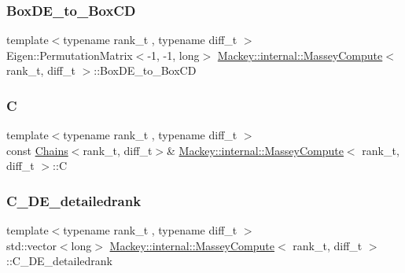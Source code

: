 \subsubsection{\texorpdfstring{Box\+D\+E\+\_\+to\+\_\+\+Box\+CD}{BoxDE\_to\_BoxCD}}
{\footnotesize\ttfamily template$<$typename rank\+\_\+t , typename diff\+\_\+t $>$ \\
Eigen\+::\+Permutation\+Matrix$<$-\/1, -\/1, long$>$ \hyperlink{structMackey_1_1internal_1_1MasseyCompute}{Mackey\+::internal\+::\+Massey\+Compute}$<$ rank\+\_\+t, diff\+\_\+t $>$\+::Box\+D\+E\+\_\+to\+\_\+\+Box\+CD}

\mbox{\label{structMackey_1_1internal_1_1MasseyCompute_abf562dca46d53425d1460f1098d8997d}} 
\subsubsection{\texorpdfstring{C}{C}}
{\footnotesize\ttfamily template$<$typename rank\+\_\+t , typename diff\+\_\+t $>$ \\
const \hyperlink{classMackey_1_1Chains}{Chains}$<$rank\+\_\+t, diff\+\_\+t$>$\& \hyperlink{structMackey_1_1internal_1_1MasseyCompute}{Mackey\+::internal\+::\+Massey\+Compute}$<$ rank\+\_\+t, diff\+\_\+t $>$\+::C}

\mbox{\label{structMackey_1_1internal_1_1MasseyCompute_a2b68ea91e153d3c1672487327da69434}} 
\subsubsection{\texorpdfstring{C\+\_\+\+D\+E\+\_\+detailedrank}{C\_DE\_detailedrank}}
{\footnotesize\ttfamily template$<$typename rank\+\_\+t , typename diff\+\_\+t $>$ \\
std\+::vector$<$long$>$ \hyperlink{structMackey_1_1internal_1_1MasseyCompute}{Mackey\+::internal\+::\+Massey\+Compute}$<$ rank\+\_\+t, diff\+\_\+t $>$\+::C\+\_\+\+D\+E\+\_\+detailedrank}

